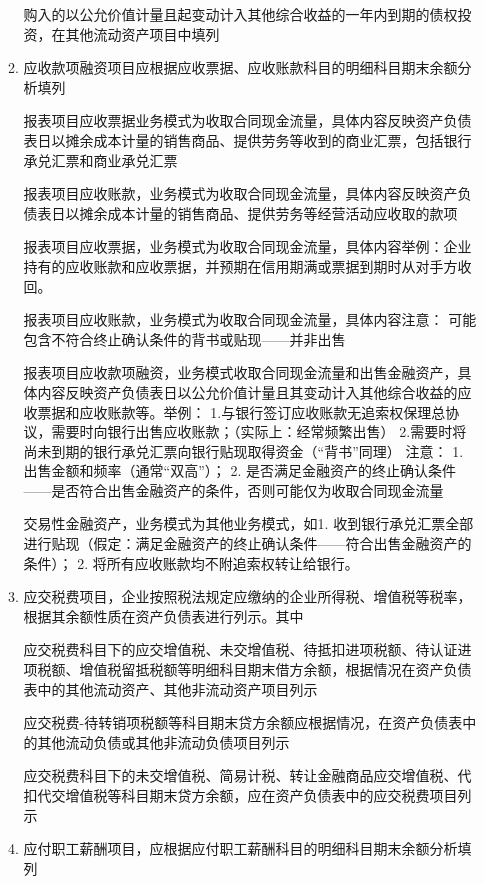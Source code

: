 \documentclass[UTF8,12pt]{ctexart}
\numberwithin{equation}{section} %
\numberwithin{figure}{section}
\numberwithin{table}{section}
\begin{document}
\begin{enumerate}
\begin{enumerate}
			购入的以公允价值计量且起变动计入其他综合收益的一年内到期的债权投资，在其他流动资产项目中填列
			
			\item 应收款项融资项目应根据应收票据、应收账款科目的明细科目期末余额分析填列
			
			报表项目应收票据业务模式为收取合同现金流量，具体内容反映资产负债表日以摊余成本计量的销售商品、提供劳务等收到的商业汇票，包括银行承兑汇票和商业承兑汇票
			
			报表项目应收账款，业务模式为收取合同现金流量，具体内容反映资产负债表日以摊余成本计量的销售商品、提供劳务等经营活动应收取的款项
			
			报表项目应收票据，业务模式为收取合同现金流量，具体内容举例：企业持有的应收账款和应收票据，并预期在信用期满或票据到期时从对手方收回。
			
			报表项目应收账款，业务模式为收取合同现金流量，具体内容注意：
			可能包含不符合终止确认条件的背书或贴现——并非出售
			
			报表项目应收款项融资，业务模式收取合同现金流量和出售金融资产，具体内容反映资产负债表日以公允价值计量且其变动计入其他综合收益的应收票据和应收账款等。举例：
			1.与银行签订应收账款无追索权保理总协议，需要时向银行出售应收账款；（实际上：经常频繁出售） 2.需要时将尚未到期的银行承兑汇票向银行贴现取得资金（“背书”同理）
			注意：
			1.	出售金额和频率（通常“双高”）；
			2.	是否满足金融资产的终止确认条件——是否符合出售金融资产的条件，否则可能仅为收取合同现金流量
			
			交易性金融资产，业务模式为其他业务模式，如1.	收到银行承兑汇票全部进行贴现（假定：满足金融资产的终止确认条件——符合出售金融资产的条件）；
			2.	将所有应收账款均不附追索权转让给银行。
			
			\item 应交税费项目，企业按照税法规定应缴纳的企业所得税、增值税等税率，根据其余额性质在资产负债表进行列示。其中
			
			应交税费科目下的应交增值税、未交增值税、待抵扣进项税额、待认证进项税额、增值税留抵税额等明细科目期末借方余额，根据情况在资产负债表中的其他流动资产、其他非流动资产项目列示
			
			应交税费-待转销项税额等科目期末贷方余额应根据情况，在资产负债表中的其他流动负债或其他非流动负债项目列示
			
			应交税费科目下的未交增值税、简易计税、转让金融商品应交增值税、代扣代交增值税等科目期末贷方余额，应在资产负债表中的应交税费项目列示
			
			\item 应付职工薪酬项目，应根据应付职工薪酬科目的明细科目期末余额分析填列
			

\end{enumerate}
\end{enumerate}
\end{document}

